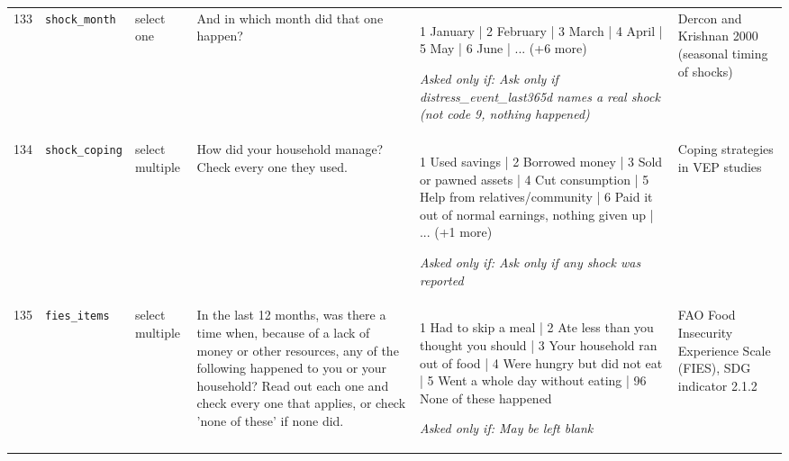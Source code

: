 \documentclass[9pt,a4paper,landscape]{article}
\begin{document}
\begin{longtable}{@{}p{0.5cm}p{3.3cm}p{1.7cm}p{7.3cm}p{5.6cm}p{5.4cm}@{}}
\footnotesize 133 & \footnotesize\texttt{shock\_month} & \scriptsize select one & \footnotesize And in which month did that one happen?\par\vspace{1pt}{\footnotesize\color{hdr}{\hifont और वह किस महीने हुआ था?}} & \scriptsize 1 January | 2 February | 3 March | 4 April | 5 May | 6 June | ... (+6 more)\par\vspace{1pt}\textit{Asked only if: Ask only if distress\_event\_last365d names a real shock (not code 9, nothing happened)} & \scriptsize Dercon and Krishnan 2000 (seasonal timing of shocks)\\
\footnotesize 134 & \footnotesize\texttt{shock\_coping} & \scriptsize select multiple & \footnotesize How did your household manage? Check every one they used.\par\vspace{1pt}{\footnotesize\color{hdr}{\hifont आपके घर ने कैसे सँभाला? उन्होंने जो-जो किया, सब चुनिए।}} & \scriptsize 1 Used savings | 2 Borrowed money | 3 Sold or pawned assets | 4 Cut consumption | 5 Help from relatives/community | 6 Paid it out of normal earnings, nothing given up | ... (+1 more)\par\vspace{1pt}\textit{Asked only if: Ask only if any shock was reported} & \scriptsize Coping strategies in VEP studies\\
\footnotesize 135 & \footnotesize\texttt{fies\_items} & \scriptsize select multiple & \footnotesize In the last 12 months, was there a time when, because of a lack of money or other resources, any of the following happened to you or your household? Read out each one and check every one that applies, or check 'none of these' if none did.\par\vspace{1pt}{\footnotesize\color{hdr}{\hifont पिछले 12 महीनों में, पैसे या साधन की कमी के कारण, क्या आपके साथ या आपके घर में इनमें से कुछ हुआ? हर एक पढ़कर पूछें और जो लागू हो वो चुनें, या कुछ नहीं हुआ तो वो चुनें।}} & \scriptsize 1 Had to skip a meal | 2 Ate less than you thought you should | 3 Your household ran out of food | 4 Were hungry but did not eat | 5 Went a whole day without eating | 96 None of these happened\par\vspace{1pt}\textit{Asked only if: May be left blank} & \scriptsize FAO Food Insecurity Experience Scale (FIES), SDG indicator 2.1.2\\
\bottomrule\end{longtable}\vspace{6pt}
\end{document}
